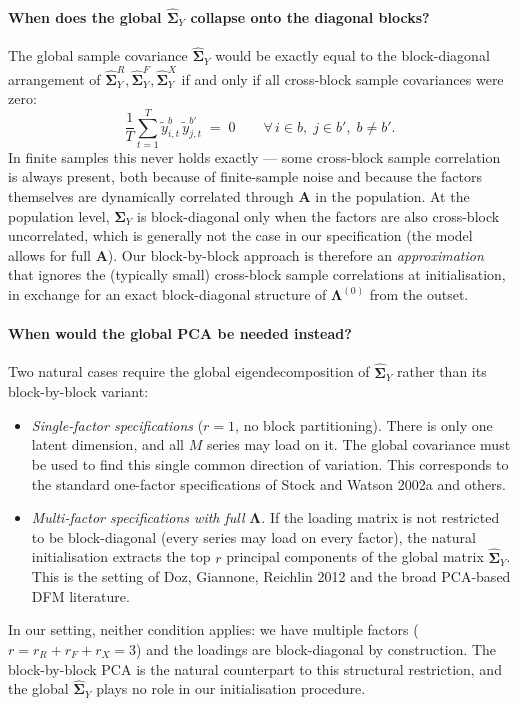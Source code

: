 \documentclass[11pt, a4paper, oneside]{article}
\begin{document}
\paragraph{When does the global $\widehat{\boldsymbol{\Sigma}}_Y$
collapse onto the diagonal blocks?}
The global sample covariance $\widehat{\boldsymbol{\Sigma}}_Y$ would
be exactly equal to the block-diagonal arrangement of
$\widehat{\boldsymbol{\Sigma}}^R_Y, \widehat{\boldsymbol{\Sigma}}^F_Y,
\widehat{\boldsymbol{\Sigma}}^X_Y$ if and only if all cross-block
sample covariances were zero:
\[
\frac{1}{T} \sum_{t=1}^T \tilde{y}^b_{i,t}\,\tilde{y}^{b'}_{j,t}
\;=\; 0
\qquad \forall\, i \in b,\; j \in b',\; b \neq b'.
\]
In finite samples this never holds exactly --- some cross-block
sample correlation is always present, both because of finite-sample
noise and because the factors themselves are dynamically correlated
through $\mathbf{A}$ in the population. At the population level,
$\boldsymbol{\Sigma}_Y$ is block-diagonal only when the factors are
also cross-block uncorrelated, which is generally not the case in
our specification (the model allows for full $\mathbf{A}$). Our
block-by-block approach is therefore an \emph{approximation} that
ignores the (typically small) cross-block sample correlations
at initialisation, in exchange for an exact block-diagonal structure
of $\boldsymbol{\Lambda}^{(0)}$ from the outset.

\paragraph{When would the global PCA be needed instead?}
Two natural cases require the global eigendecomposition of
$\widehat{\boldsymbol{\Sigma}}_Y$ rather than its block-by-block
variant:
\begin{itemize}[leftmargin=1.5em, itemsep=2pt]
  \item \emph{Single-factor specifications} ($r = 1$, no block
        partitioning). There is only one latent dimension, and all
        $M$ series may load on it. The global covariance must be
        used to find this single common direction of variation.
        This corresponds to the standard one-factor specifications
        of Stock and Watson 2002a and others.
  \item \emph{Multi-factor specifications with full
        $\boldsymbol{\Lambda}$.} If the loading matrix is not
        restricted to be block-diagonal (every series may load on
        every factor), the natural initialisation extracts the
        top $r$ principal components of the global matrix
        $\widehat{\boldsymbol{\Sigma}}_Y$. This is the setting of
        Doz, Giannone, Reichlin 2012 and the broad PCA-based
        DFM literature.
\end{itemize}
In our setting, neither condition applies: we have multiple factors
($r = r_R + r_F + r_X = 3$) and the loadings are block-diagonal by
construction. The block-by-block PCA is the natural counterpart to
this structural restriction, and the global $\widehat{\boldsymbol{\Sigma}}_Y$
plays no role in our initialisation procedure.
\end{document}
